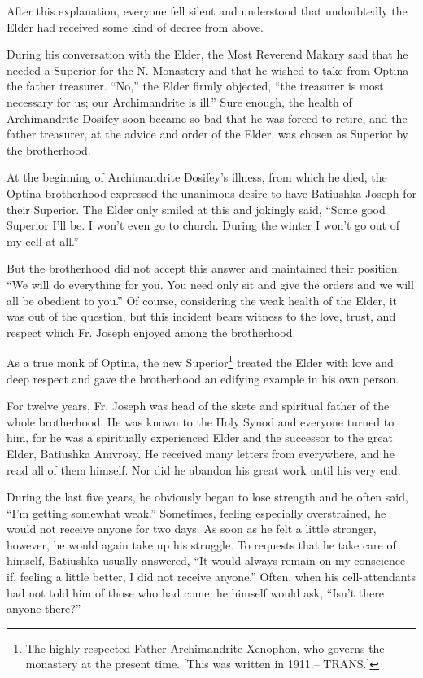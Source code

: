 After this explanation, everyone fell silent and understood that undoubtedly the Elder had received some kind of decree from above.

During his conversation with the Elder, the Most Reverend Makary said that he needed a Superior for the N. Monastery and that he wished to take from Optina the father treasurer. ``No,'' the Elder firmly objected, ``the treasurer is most necessary for us; our Archimandrite is ill.'' Sure enough, the health of Archimandrite Dosifey soon became so bad that he was forced to retire, and the father treasurer, at the advice and order of the Elder, was chosen as Superior by the brotherhood.

At the beginning of Archimandrite Dosifey's illness, from which he died, the Optina brotherhood expressed the unanimous desire to have Batiushka Joseph for their Superior. The Elder only smiled at this and jokingly said, ``Some good Superior I'll be. I won't even go to church. During the winter I won't go out of my cell at all.''

But the brotherhood did not accept this answer and maintained their position. ``We will do everything for you. You need only sit and give the orders and we will all be obedient to you.'' Of course, considering the weak health of the Elder, it was out of the question, but this incident bears witness to the love, trust, and respect which Fr. Joseph enjoyed among the brotherhood.

As a true monk of Optina, the new Superior\footnote{The highly-respected Father Archimandrite Xenophon, who governs the monastery at the present time. [This was written in 1911.\scriptsize -- TRANS.\footnotesize ]} treated the Elder with love and deep respect and gave the brotherhood an edifying example in his own person.

For twelve years, Fr. Joseph was head of the skete and spiritual father of the whole brotherhood. He was known to the Holy Synod and everyone turned to him, for he was a spiritually experienced Elder and the successor to the great Elder, Batiushka Amvrosy. He received many letters from everywhere, and he read all of them himself. Nor did he abandon his great work until his very end.

During the last five years, he obviously began to lose strength and he often said, ``I'm getting somewhat weak.'' Sometimes, feeling especially overstrained, he would not receive anyone for two days. As soon as he felt a little stronger, however, he would again take up his struggle. To requests that he take care of himself, Batiushka usually answered, ``It would always remain on my conscience if, feeling a little better, I did not receive anyone.'' Often, when his cell-attendants had not told him of those who had come, he himself would ask, ``Isn't there anyone there?''

